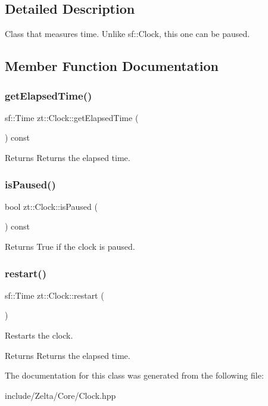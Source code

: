 \subsection{Detailed Description}
Class that measures time. Unlike sf\+::\+Clock, this one can be paused. 

\subsection{Member Function Documentation}
\mbox{\label{classzt_1_1_clock_a7cd9408d376156ed1ef710ebdeed2615}} 
\subsubsection{\texorpdfstring{get\+Elapsed\+Time()}{getElapsedTime()}}
{\footnotesize\ttfamily sf\+::\+Time zt\+::\+Clock\+::get\+Elapsed\+Time (\begin{DoxyParamCaption}{ }\end{DoxyParamCaption}) const}

\begin{DoxyReturn}{Returns}
Returns the elapsed time. 
\end{DoxyReturn}
\mbox{\label{classzt_1_1_clock_ad9ec39488832c24128d8b6af3b20fc80}} 
\subsubsection{\texorpdfstring{is\+Paused()}{isPaused()}}
{\footnotesize\ttfamily bool zt\+::\+Clock\+::is\+Paused (\begin{DoxyParamCaption}{ }\end{DoxyParamCaption}) const}

\begin{DoxyReturn}{Returns}
True if the clock is paused. 
\end{DoxyReturn}
\mbox{\label{classzt_1_1_clock_a25742e0b8d93ed9d9a03f1ebc01edd76}} 
\subsubsection{\texorpdfstring{restart()}{restart()}}
{\footnotesize\ttfamily sf\+::\+Time zt\+::\+Clock\+::restart (\begin{DoxyParamCaption}{ }\end{DoxyParamCaption})}



Restarts the clock. 

\begin{DoxyReturn}{Returns}
Returns the elapsed time. 
\end{DoxyReturn}


The documentation for this class was generated from the following file\+:\begin{DoxyCompactItemize}
\item 
include/\+Zelta/\+Core/Clock.\+hpp\end{DoxyCompactItemize}
